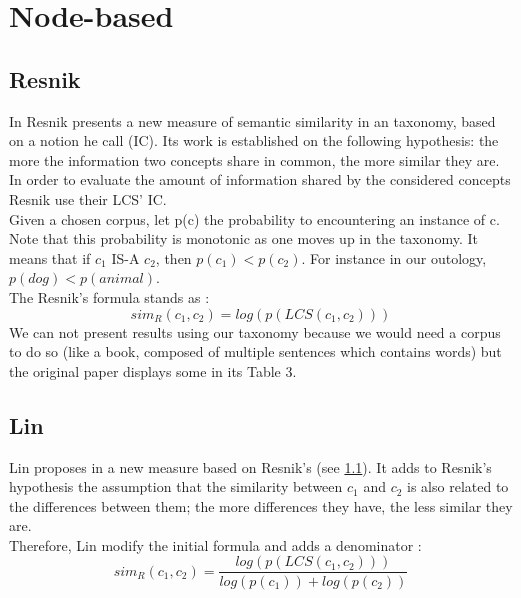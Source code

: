 
\section{Node-based}

\subsection{Resnik} %
\label{sub:resnik}
In \cite{resnik1995using} Resnik presents a new measure of semantic similarity in an  taxonomy, based on a notion he call  (IC). Its work is established on the following hypothesis: the
more the information two concepts share in common, the more similar they are. In order to evaluate the amount of information shared by the considered concepts Resnik use their LCS' IC.\\
Given a chosen corpus, let p(c) the probability to encountering an instance of c. Note that this probability is monotonic as one moves up in the taxonomy. It means that if $c_1$ IS-A $c_2$, then $p(c_1) < p(c_2)$. For instance in our outology, $p(dog) < p(animal)$.\\
The Resnik's formula stands as :
\begin{equation}
\label{eq:resnik}
sim_R(c_1, c_2) = log(p(LCS(c_1,c_2)))
\end{equation}
We can not present results using our taxonomy because we would need a corpus to do so (like a book, composed of multiple sentences which contains words) but the original paper displays some in its Table 3.

\subsection{Lin} %
\label{sub:lin}
Lin proposes in \cite{lin1998information} a new measure based on Resnik's (see \ref{sub:resnik}). It adds to Resnik's hypothesis the assumption that the similarity between $c_1$ and $c_2$ is also related to the differences between them; the more differences they have, the less similar they are.\\
Therefore, Lin modify the initial formula and adds a denominator :
\begin{equation}
\label{eq:lin}
sim_R(c_1, c_2) = \frac{log(p(LCS(c_1,c_2)))}{log(p(c_1)) + log(p(c_2))}
\end{equation}

